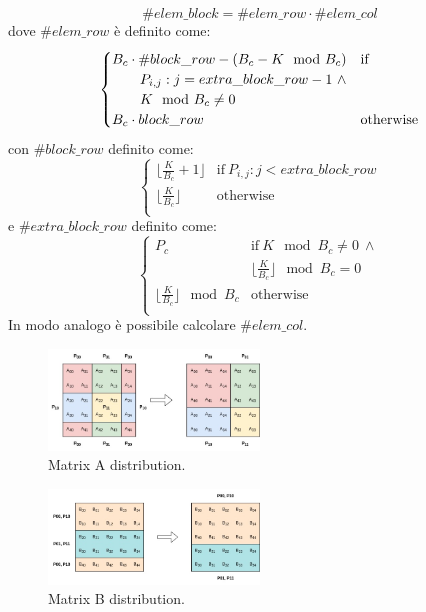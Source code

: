 \documentclass[conference]{IEEEtran}
\begin{document}
\begin{equation}
    \#elem\_block=\#elem\_row\cdot \#elem\_col
\end{equation}
dove $\#elem\_row$ è definito come:
\begin{equation}
    \begin{cases}
        B_c\cdot \#block\_row-(B_c-K \mod B_c) &  \text{if}\ \\
        \text{\quad}\text{\quad} P_{i,j} : j=extra\_block\_row-1 \ \land \\ 
        \text{\quad} \text{\quad}K \mod B_c \neq 0\\
        B_c\cdot block\_row & \text{otherwise}\\
    \end{cases} 
\end{equation}
con $\#block\_row$ definito come:
\begin{equation}
    \begin{cases}
        \lfloor\frac{K}{B_c}+1\rfloor &  \text{if}\ P_{i,j} : j<extra\_block\_row\\
        \lfloor\frac{K}{B_c}\rfloor & \text{otherwise}\\
    \end{cases} 
\end{equation}
e $\#extra\_block\_row$ definito come:
\begin{equation}
    \begin{cases}
        P_c &  \text{if}\ K \mod B_c \neq 0 \ \land \\
        & \lfloor\frac{K}{B_c}\rfloor \mod B_c=0\\
        \lfloor\frac{K}{B_c}\rfloor \mod B_c & \text{otherwise}\\
    \end{cases} 
\end{equation}
In modo analogo è possibile calcolare $\#elem\_col$.
\begin{figure}[H]
    \centering
    \includegraphics[width=0.5\textwidth]{resources/matrixA_2d_block_cyclic_distribution.jpg}
    \caption{Matrix A distribution.}
    \label{fig:matrix_a_distribution}
\end{figure}
\begin{figure}[H]
    \centering
    \includegraphics[width=0.5\textwidth]{resources/matrixB_row_block_cyclic_distribution.jpg}
    \caption{Matrix B distribution.}
    \label{fig:matrix_b_distribution}
\end{figure}
\end{document}
